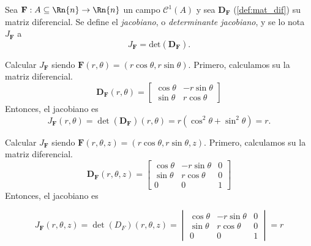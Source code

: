
\begin{definition}
    Sea $\mathbf{F}:A\subseteq\Rn{n}\to\Rn{n}$ un campo $\mathcal{C}^1(A)$ y sea $\boldsymbol{D}_\mathbf{F}$ (\autoref{def:mat_dif}) su matriz diferencial.  Se define el \emph{jacobiano}, o \emph{determinante jacobiano}, y se lo nota $J_\mathbf{F}$ a 
    \[
        J_\mathbf{F}=\text{det}(\boldsymbol{D}_\mathbf{F}).
    \]
\end{definition}


\begin{example}  Calcular $J_\mathbf{F}$ siendo  \( \mathbf{F}(r, \theta) = (r\cos\theta, r\sin\theta) \).
\label{ejemplo_jacobiano_polares}
 Primero, calculamos su la matriz diferencial.
       \[
       \boldsymbol{D}_{\mathbf{F}}(r, \theta) 
       =
       \begin{bmatrix}
       \cos\theta & -r\sin\theta \\
       \sin\theta & r\cos\theta
       \end{bmatrix}
       \]
       Entonces, el jacobiano es
       \[
       J_{\mathbf{F}}(r, \theta) = \det(\boldsymbol{D}_{\mathbf{F}})(r, \theta) = 
      r(\cos^2\theta + \sin^2\theta) = r.
       \]
   \end{example}
   
   \begin{example}  Calcular $J_\mathbf{F}$   siendo   \( \mathbf{F}(r, \theta, z) = (r\cos\theta, r\sin\theta, z) \).
   \label{ej:jacobiano_cilindrico}     
  Primero, calculamos su la matriz diferencial.
   \[
    \boldsymbol{D}_{\mathbf{F}} (r, \theta,  z)=
    \begin{bmatrix}
   \cos\theta & -r\sin\theta & 0 \\
   \sin\theta & r\cos\theta & 0 \\
   0 & 0 & 1
   \end{bmatrix}
   \]   
    Entonces, el jacobiano es 
   
   \[
   J_\mathbf{F} (r, \theta, z) = \det(D_F)(r, \theta, z)  = 
   \begin{vmatrix}
   \cos\theta & -r\sin\theta & 0 \\
   \sin\theta & r\cos\theta & 0 \\
   0 & 0 & 1
   \end{vmatrix}
   = r
   \]
   \end{example}
   
